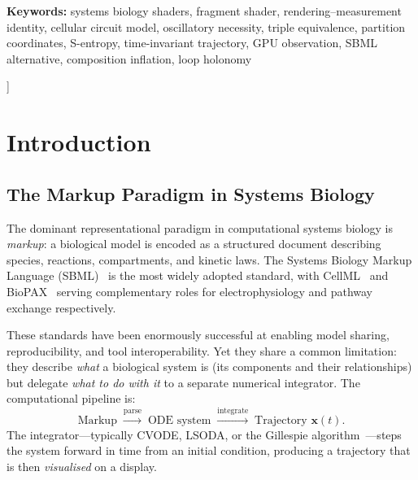 \documentclass[11pt,twocolumn,a4paper]{article}
\begin{document}
\begin{@twocolumnfalse}
\begin{center}
\begin{minipage}{0.92\textwidth}
\vspace{8pt}
\noindent\textbf{Keywords:} systems biology shaders, fragment shader,
rendering--measurement identity, cellular circuit model, oscillatory
necessity, triple equivalence, partition coordinates, S-entropy,
time-invariant trajectory, GPU observation, SBML alternative,
composition inflation, loop holonomy
\end{minipage}

\vspace{18pt}
\end{center}
\end{@twocolumnfalse}
]


\section{Introduction}
\label{sec:introduction}

\subsection{The Markup Paradigm in Systems Biology}

The dominant representational paradigm in computational systems biology
is \emph{markup}: a biological model is encoded as a structured
document describing species, reactions, compartments, and kinetic
laws.  The Systems Biology Markup Language
(SBML)~\citep{hucka2003sbml,keating2020sbml} is the most widely
adopted standard, with CellML~\citep{lloyd2004cellml} and
BioPAX~\citep{demir2010biopax} serving complementary roles for
electrophysiology and pathway exchange respectively.

These standards have been enormously successful at enabling model
sharing, reproducibility, and tool interoperability.  Yet they share a
common limitation: they describe \emph{what} a biological system is
(its components and their relationships) but delegate \emph{what to do
with it} to a separate numerical integrator.  The computational
pipeline is:
\begin{equation}
  \text{Markup} \;\xrightarrow{\text{parse}}\;
  \text{ODE system} \;\xrightarrow{\text{integrate}}\;
  \text{Trajectory } \mathbf{x}(t).
  \label{eq:markup-pipeline}
\end{equation}
The integrator---typically CVODE, LSODA, or the Gillespie
algorithm~\citep{gillespie1977}---steps the system forward in time from
an initial condition, producing a trajectory that is then
\emph{visualised} on a display.
\end{document}
